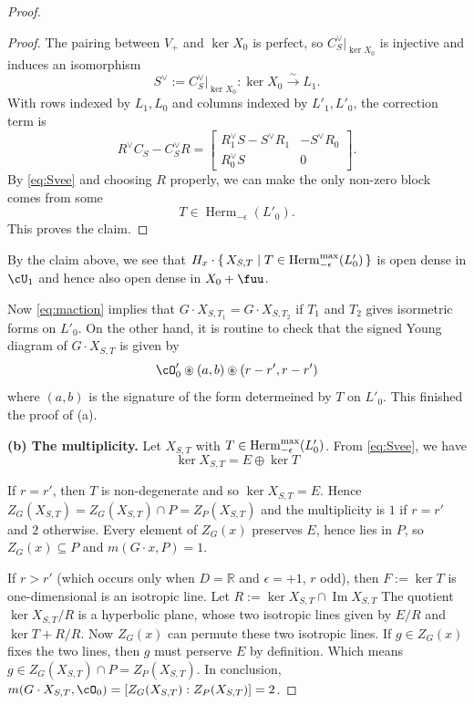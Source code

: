 \documentclass[11pt,a4paper]{amsart}
\def\Im{\operatorname{Im}}
\numberwithin{equation}{section}
\theoremstyle{remark}
\begin{document}
\begin{proof}
\begin{proof}
The pairing between $V_+$ and $\ker X_0$ is perfect, so 
$C_S^\vee|_{\ker X_0}$ is injective and induces an isomorphism 
\begin{equation}\label{eq:Svee}
S^\vee := C_S^\vee|_{\ker X_0}:\ker X_0\xrightarrow{\sim}L_1.
\end{equation}
With rows indexed by $L_1,L_0$ and columns indexed by $L'_1,L'_0$, the correction term is
$$
R^\vee C_S-C_S^\vee R=
\begin{bmatrix}
R_1^\vee S- S^\vee R_1&-S^\vee R_0\\
R_0^\vee S&0
\end{bmatrix}.                                
$$
By \eqref{eq:Svee} and choosing $R$ properly, we can make the only non-zero block comes from some
$$
T\in\operatorname{Herm}_{-\epsilon}(L'_0).
$$
This proves the claim.
\end{proof}
By the claim above, we see that $H_x \cdot \set{ X_{S,T} | T\in \mathrm{Herm}_{-\epsilon}^{\mathrm{max}}(L'_0)}$ is open dense in $\cU_1$ and hence also open dense in $X_0 + \fuu$.  


Now \eqref{eq:maction} implies that $G \cdot X_{S,T_1} = G \cdot X_{S,T_2}$ if $T_1$ and $T_2$ gives isormetric forms on $L'_0$. 
On the other hand, it is routine to check that the signed Young diagram of 
$G\cdot X_{S,T}$ is given by 
\[
\cO'_0 \circledast (a,b) \circledast (r-r',r-r')
\]
where $(a,b)$ is the signature of the form determeined by $T$ on $L'_0$.  
This finished the proof of (a). 


\smallskip\noindent\textbf{(b) The multiplicity.}
Let $X_{S,T}$ with $T\in\mathrm{Herm}_{-\epsilon}^{\mathrm{max}}(L'_0)$.
From \eqref{eq:Svee}, we have
\[
\ker X_{S,T} =E\oplus\ker T
\]

If $r=r'$, then $T$ is  non-degenerate and so $\ker X_{S,T}=E$. Hence $Z_{G}(X_{S,T})= Z_G(X_{S,T})\cap P = Z_{P}(X_{S,T})$ and the multiplicity is $1$ if $r=r'$ and $2$ otherwise.  
Every element of $Z_G(x)$ preserves $E$, hence lies in $P$, so $Z_G(x)\subseteq P$ and $m(G\cdot x,P)=1$.

If $r > r'$ (which occurs only when $D=\mathbb R$ and $\epsilon=+1$, $r$ odd), then $F:=\ker T$ is one-dimensional is an isotropic line.
Let $R := \ker X_{S,T}\cap\Im X_{S,T} $
The quotient $\ker X_{S,T}/R$ is a hyperbolic plane, whose two isotropic lines
given by $E /R $ and $\ker T + R/R$.  
Now $Z_G(x)$ can permute these two isotropic lines.
If $g\in Z_G(x)$ fixes the two lines, then $g$ must perserve $E$ by definition. Which means $g\in Z_G(X_{S,T}) \cap P  =  Z_P(X_{S,T})$.  In conclusion,
$m(G\cdot X_{S,T},\cO_0)= [Z_{G}(X_{S,T}) : Z_{P}(X_{S,T})]=2$.
\end{proof}
\end{document}
